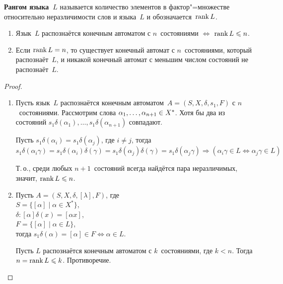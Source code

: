 \textbf{Рангом языка~$L$} называется количество элементов в фактор"=множестве относительно неразличимости слов и языка~$L$ и обозначается~$\operatorname{rank} L$.

\begin{theorem}
\begin{enumerate}
	\item Язык~$L$ распознаётся конечным автоматом с $n$~состояниями $\Leftrightarrow$ $\operatorname{rank} L \leqslant n$.
	\item Если $\operatorname{rank} L = n$, то существует конечный автомат с $n$~состояниями, который распознаёт~$L$, и никакой конечный автомат с меньшим числом состояний не распознаёт~$L$.
\end{enumerate}
\end{theorem}
\begin{proof}
\begin{enumerate}
	\item Пусть язык~$L$ распознаётся конечным автоматом~$A = (S, X, \delta, s_1, F)$ с $n$~состояниями.
	Рассмотрим слова $\alpha_1, \ldots, \alpha_{n+1} \opbr\in X^*$.
	Хотя бы два из состояний $s_1 \delta(\alpha_1), \ldots, s_1 \delta(\alpha_{n+1})$ совпадают.
	
	Пусть $s_1 \delta(\alpha_i) = s_1 \delta(\alpha_j)$, где $i \neq j$, тогда
	\begin{equation*}
	s_1 \delta(\alpha_i \gamma) =
	s_1 \delta(\alpha_i) \delta(\gamma) =
	s_1 \delta(\alpha_j) \delta(\gamma) =
	s_1 \delta(\alpha_j \gamma) \Rightarrow
	(\alpha_i \gamma \in L \Leftrightarrow \alpha_j \gamma \in L)
	\end{equation*}
	
	Т.\,о., среди любых $n + 1$~состояний всегда найдётся пара неразличимых, значит, $\operatorname{rank} L \leqslant n$.
	
	\item Пусть $A = (S, X, \delta, [\lambda], F)$, где\\
	$S = \{ [\alpha] \mid \alpha \in X^* \}$,\\
	$\delta \colon [\alpha] \delta(x) = [\alpha x]$,\\
	$F = \{ [\alpha] \mid \alpha \in L \}$,\\
	тогда $s_1 \delta(\alpha) = [\alpha] \in F \Leftrightarrow \alpha \in L$.
	
	Пусть $L$ распознаётся конечным автоматом с $k$~состояниями, где $k < n$.
	Тогда $n = \operatorname{rank} L \leqslant k$.
	Противоречие.
\end{enumerate}
\end{proof}

